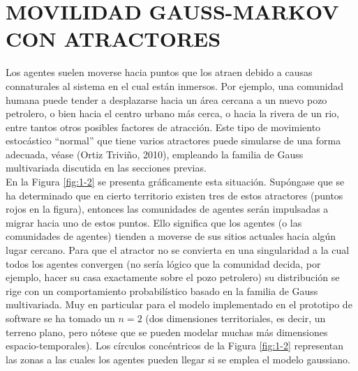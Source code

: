 \section{MOVILIDAD GAUSS-MARKOV CON ATRACTORES}
Los agentes suelen moverse hacia puntos que los atraen debido a causas connaturales al sistema en el cual están inmersos. Por ejemplo, una comunidad humana puede tender a desplazarse hacia un área cercana a un nuevo pozo petrolero, o bien hacia el centro urbano más cerca, o hacia la rivera de un rio, entre tantos otros posibles factores de atracción. Este tipo de movimiento estocástico “normal” que tiene varios atractores puede simularse de una forma adecuada, véase (Ortiz Triviño, 2010),   empleando la familia de Gauss multivariada discutida en las secciones previas. \\
En la Figura \ref{fig:1-2} se presenta gráficamente esta situación. Supóngase que se ha determinado que en cierto territorio existen tres de estos atractores (puntos rojos en la figura), entonces las comunidades de agentes serán impulsadas a migrar hacia uno de estos puntos.  Ello significa que los agentes (o las comunidades de agentes) tienden a moverse de sus sitios actuales hacia algún lugar cercano. Para que el atractor no se convierta en una singularidad a la cual todos los agentes convergen (no sería lógico que la comunidad decida, por ejemplo, hacer su casa exactamente sobre el pozo petrolero) su distribución se rige con un comportamiento probabilístico basado en la familia de Gauss multivariada.  Muy en particular para el modelo implementado en el prototipo de software se ha tomado un   $n=2$ (dos dimensiones territoriales, es decir, un terreno plano, pero nótese que se pueden modelar muchas más dimensiones espacio-temporales).   Los círculos concéntricos de la Figura \ref{fig:1-2} representan las zonas a las cuales los agentes pueden llegar si se emplea el modelo gaussiano.

